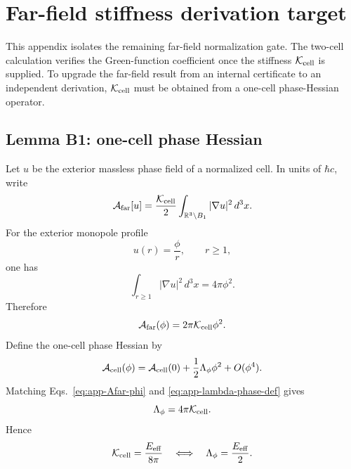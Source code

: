 \documentclass[11pt]{article}
\begin{document}
\section{Far-field stiffness derivation target}
\label{app:farfield-stiffness-target}

This appendix isolates the remaining far-field normalization gate.  The
two-cell calculation verifies the Green-function coefficient once the stiffness
\(\mathcal K_{\rm cell}\) is supplied.  To upgrade the far-field result from an
internal certificate to an independent derivation, \(\mathcal K_{\rm cell}\)
must be obtained from a one-cell phase-Hessian operator.

\subsection{Lemma B1: one-cell phase Hessian}

Let \(u\) be the exterior massless phase field of a normalized cell.  In units
of \(\hbar c\), write
\begin{equation}
  \mathcal A_{\rm far}[u]
  =
  \frac{\mathcal K_{\rm cell}}{2}
  \int_{\mathbb R^3\setminus B_1}
  |\nabla u|^2\,d^3x .
  \label{eq:app-farfield-energy-K}
\end{equation}
For the exterior monopole profile
\begin{equation}
  u(r)=\frac{\phi}{r},
  \qquad r\ge1,
\end{equation}
one has
\begin{equation}
  \int_{r\ge1}
  |\nabla u|^2\,d^3x
  =
  4\pi\phi^2 .
  \label{eq:app-phase-gradient-integral}
\end{equation}
Therefore
\begin{equation}
  \mathcal A_{\rm far}(\phi)
  =
  2\pi\mathcal K_{\rm cell}\phi^2 .
  \label{eq:app-Afar-phi}
\end{equation}
Define the one-cell phase Hessian by
\begin{equation}
  \mathcal A_{\rm cell}(\phi)
  =
  \mathcal A_{\rm cell}(0)
  +
  \frac{1}{2}\Lambda_\phi\phi^2
  +
  O(\phi^4).
  \label{eq:app-lambda-phase-def}
\end{equation}
Matching Eqs.~\eqref{eq:app-Afar-phi} and
\eqref{eq:app-lambda-phase-def} gives
\begin{equation}
  \Lambda_\phi=4\pi\mathcal K_{\rm cell}.
  \label{eq:app-lambda-K}
\end{equation}
Hence
\begin{equation}
  \mathcal K_{\rm cell}
  =
  \frac{E_{\rm eff}}{8\pi}
  \quad\Longleftrightarrow\quad
  \Lambda_\phi=\frac{E_{\rm eff}}{2}.
  \label{eq:app-Kcell-Lambda-target}
\end{equation}
\end{document}
